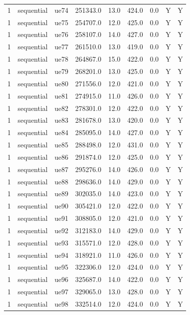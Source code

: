 \begin{table}[ht]
\begin{tabular}{|c|c|c|c|c|c|c|c|c|}
1 & sequential & ue74 & 251343.0 & 13.0 & 424.0 & 0.0 & Y & Y \\
1 & sequential & ue75 & 254707.0 & 12.0 & 425.0 & 0.0 & Y & Y \\
1 & sequential & ue76 & 258107.0 & 14.0 & 427.0 & 0.0 & Y & Y \\
1 & sequential & ue77 & 261510.0 & 13.0 & 419.0 & 0.0 & Y & Y \\
1 & sequential & ue78 & 264867.0 & 15.0 & 422.0 & 0.0 & Y & Y \\
1 & sequential & ue79 & 268201.0 & 13.0 & 425.0 & 0.0 & Y & Y \\
1 & sequential & ue80 & 271556.0 & 12.0 & 421.0 & 0.0 & Y & Y \\
1 & sequential & ue81 & 274915.0 & 11.0 & 426.0 & 0.0 & Y & Y \\
1 & sequential & ue82 & 278301.0 & 12.0 & 422.0 & 0.0 & Y & Y \\
1 & sequential & ue83 & 281678.0 & 13.0 & 420.0 & 0.0 & Y & Y \\
1 & sequential & ue84 & 285095.0 & 14.0 & 427.0 & 0.0 & Y & Y \\
1 & sequential & ue85 & 288498.0 & 12.0 & 431.0 & 0.0 & Y & Y \\
1 & sequential & ue86 & 291874.0 & 12.0 & 425.0 & 0.0 & Y & Y \\
1 & sequential & ue87 & 295276.0 & 14.0 & 426.0 & 0.0 & Y & Y \\
1 & sequential & ue88 & 298636.0 & 14.0 & 429.0 & 0.0 & Y & Y \\
1 & sequential & ue89 & 302035.0 & 14.0 & 423.0 & 0.0 & Y & Y \\
1 & sequential & ue90 & 305421.0 & 12.0 & 422.0 & 0.0 & Y & Y \\
1 & sequential & ue91 & 308805.0 & 12.0 & 421.0 & 0.0 & Y & Y \\
1 & sequential & ue92 & 312183.0 & 14.0 & 429.0 & 0.0 & Y & Y \\
1 & sequential & ue93 & 315571.0 & 12.0 & 428.0 & 0.0 & Y & Y \\
1 & sequential & ue94 & 318921.0 & 11.0 & 426.0 & 0.0 & Y & Y \\
1 & sequential & ue95 & 322306.0 & 12.0 & 424.0 & 0.0 & Y & Y \\
1 & sequential & ue96 & 325687.0 & 14.0 & 422.0 & 0.0 & Y & Y \\
1 & sequential & ue97 & 329065.0 & 13.0 & 428.0 & 0.0 & Y & Y \\
1 & sequential & ue98 & 332514.0 & 12.0 & 424.0 & 0.0 & Y & Y \\

\end{tabular}
\end{table}
